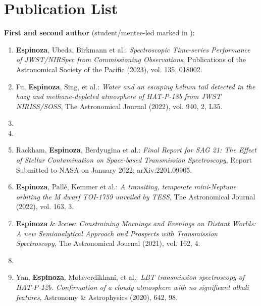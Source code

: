 \documentclass[12pt, a4paper]{article} %
\begin{document}
\section*{Publication List}
\begin{flushleft}%
  \setlength{\leftskip}{0.2cm}%
\textbf{First and second author} (student/mentee-led marked in {}):
\begin{enumerate}
\setlength\itemsep{0.05cm}

\item \textbf{Espinoza}, Ubeda, Birkmann et al.: \textit{Spectroscopic Time-series Performance of JWST/NIRSpec from Commissioning Observations}, Publications of the Astronomical Society of the Pacific (2023), vol. 135, 018002.
\item Fu, \textbf{Espinoza}, Sing, et al.: \textit{Water and an escaping helium tail detected in the hazy and methane-depleted atmosphere of HAT-P-18b from JWST NIRISS/SOSS}, The Astronomical Journal (2022), vol. 940, 2, L35.
\item  {}
\item  {}
\item Rackham, \textbf{Espinoza}, Berdyugina et al.: \textit{Final Report for SAG 21: The Effect of Stellar Contamination on Space-based Transmission Spectroscopy}, Report Submitted to NASA on January 2022; arXiv:2201.09905.
\item \textbf{Espinoza}, Pall\'e, Kemmer et al.: \textit{A transiting, temperate mini-Neptune orbiting the M dwarf TOI-1759 unveiled by TESS}, The Astronomical Journal (2022), vol. 163, 3.
\item \textbf{Espinoza} \& Jones: \textit{Constraining Mornings and Evenings on Distant Worlds: A new Semianalytical Approach and Prospects with Transmission Spectroscopy}, The Astronomical Journal (2021), vol. 162, 4.
\item  {}
\item Yan, \textbf{Espinoza}, Molaverdikhani, et al.: \textit{LBT transmission spectroscopy of HAT-P-12b. Confirmation of a cloudy atmosphere with no significant alkali features}, Astronomy \& Astrophysics (2020), 642, 98.

\end{enumerate}
\end{flushleft}
\end{document}
